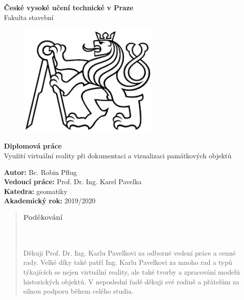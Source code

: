 \documentclass[a4paper, 12pt]{report}
\begin{document}
\begin{titlepage}
\begin{center}
\noindent
\Large {\textbf{České vysoké učení technické v Praze}\\Fakulta stavební}
\vspace{3cm}

\huge

\begin{figure}[h!]
	\centering
	\includegraphics[width=7cm]{logo.png}
\end{figure}

\vspace{0.5cm}

\Huge  
\textbf{Diplomová práce}\\
\Large Využití virtuální reality při dokumentaci a vizualizaci památkových objektů
\end{center}

\vfill

\begin{flushleft}
\normalsize \textbf{Autor:}
\normalsize Bc. Robin Pflug \\
\normalsize \textbf{Vedoucí práce:}
\normalsize Prof. Dr. Ing. Karel Pavelka\\
\normalsize \textbf{Katedra:} geomatiky\\
\normalsize \textbf{Akademický rok:} 2019/2020
\end{flushleft}

\end{titlepage}



\newpage


\renewcommand{\abstractname}{}
\begin{abstract}
\vfill
\begin{large}
\textbf{Poděkování}
\end{large}\\
\\
Děkuji Prof. Dr. Ing. Karlu Pavelkovi za odborné vedení práce a cenné rady. Velké díky také patří Ing. Karlu Pavelkovi za mnoho rad a typů týkajících se nejen virtuální reality, ale také tvorby a zpracování modelů historických objektů. V neposlední řadě děkuji své rodině a přátelům za silnou podporu během celého studia. 
\end{abstract}
\end{document}
